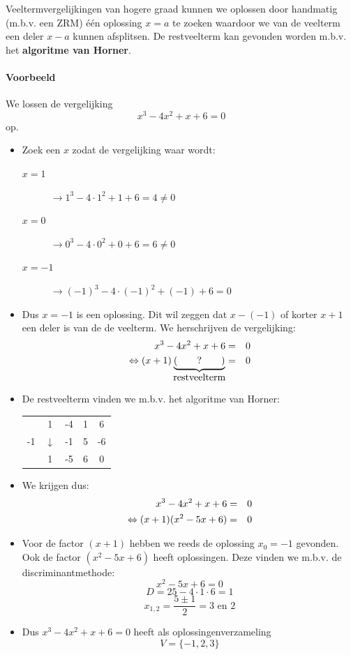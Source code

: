 \documentclass[12pt]{article}
\begin{document}
Veeltermvergelijkingen van hogere graad kunnen we oplossen door handmatig (m.b.v. een ZRM) één oplossing $x=a$ te zoeken waardoor we van de veelterm een deler $x-a$ kunnen afsplitsen. De restveelterm kan gevonden worden m.b.v. het {\bf algoritme van Horner}.

\paragraph{Voorbeeld}

We lossen de vergelijking $$x^3-4x^2+x+6=0$$ op.

\begin{itemize}
\item Zoek een $x$ zodat de vergelijking waar wordt:
  \begin{description}
  \item[$x=1$] $\rightarrow 1^3-4\cdot 1^2+1+6 = 4 \neq 0$
  \item[$x=0$] $\rightarrow 0^3-4\cdot 0^2+0+6 = 6 \neq 0$
  \item[$x=-1$] $\rightarrow (-1)^3-4\cdot (-1)^2+(-1)+6 = 0$
  \end{description}
\item Dus $x=-1$ is een oplossing. Dit wil zeggen dat $x-(-1)$ of korter $x+1$ een deler is van de de veelterm. We herschrijven de vergelijking:
  \begin{eqnarray*}
    x^3-4x^2+x+6&=&0\\
    \Leftrightarrow (x+1)\underbrace{(\qquad ? \qquad)}_{\mbox{restveelterm}}&=&0\\
  \end{eqnarray*}
\item De restveelterm vinden we m.b.v. het algoritme van Horner:
  \begin{center}
    \begin{tabular}{c|cccc}
      & 1 & -4 & 1 & 6\\
      -1 & $\downarrow$ & -1 & 5 & -6\\
      \hline
      & 1 & -5 & 6 & 0
    \end{tabular}
  \end{center}
\item We krijgen dus:
  \begin{eqnarray*}
    x^3-4x^2+x+6&=&0\\
    \Leftrightarrow (x+1)(x^2-5x+6)&=&0\\
  \end{eqnarray*}
\item Voor de factor $(x+1)$ hebben we reeds de oplossing $x_0=-1$ gevonden. Ook de factor $(x^2-5x+6)$ heeft oplossingen. Deze vinden we m.b.v. de discriminantmethode:
  $$x^2-5x+6=0$$
  $$D=25-4\cdot 1\cdot 6=1$$
  $$x_{1,2}=\dfrac{5\pm 1}{2}=3\mbox{ en }2$$
\item Dus $x^3-4x^2+x+6=0$ heeft als oplossingenverzameling
  $$V=\{-1, 2, 3\}$$
\end{itemize}
\end{document}
